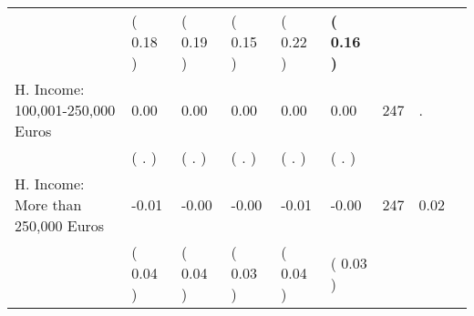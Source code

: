\begin{tabular}{L{6.2cm} C{1.8cm} C{1.8cm} C{1.8cm} C{1.8cm} C{1.8cm} C{1.8cm} C{0.3cm} C{0.3cm}}
 & (     0.18 ) & (     0.19 ) & (     0.15 ) & (     0.22 ) & \textbf{(     0.16 )}  & \\
H. Income: 100,001-250,000 Euros &      0.00 &      0.00 &      0.00 &      0.00 &      0.00  & 247 &          . \\ 
 & (        . ) & (        . ) & (        . ) & (        . ) & (        . )  & \\
H. Income: More than 250,000 Euros &     -0.01 &     -0.00 &     -0.00 &     -0.01 &     -0.00  & 247 &       0.02 \\ 
 & (     0.04 ) & (     0.04 ) & (     0.03 ) & (     0.04 ) & (     0.03 )  & \\
\bottomrule
\end{tabular}
